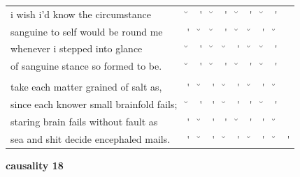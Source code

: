\documentclass[12pt, landscape]{article}
\begin{document}
\begin{center}
\begin{tabularx}{\textwidth}{
>{\lefting\arraybackslash}X
c
c
c
c
c
c
c
c
c
}

i wish i'd know the circumstance & \u{} & \'{} & \u{} & \'{} & \u{} & \'{} & \u{} & \'{} & \\
sanguine to self would be round me & \'{} & \u{} & \u{} & \'{} & \u{} & \u{} & \'{} & \u{} & \\
whenever i stepped into glance & \u{} & \'{} & \u{} & \u{} & \'{} & \u{} & \u{} & \'{} & \\
of sanguine stance so formed to be. & \u{} & \'{} & \u{} & \'{} & \u{} & \'{} & \u{} & \'{} & \\
 & & & & & & & & \\
take each matter grained of salt as, & \'{} & \u{} & \'{} & \u{} & \'{} & \u{} & \'{} & \u{} & \\
since each knower small brainfold fails; & \u{} & \'{} & \'{} & \u{} & \'{} & \'{} & \u{} & \'{} & \\
staring brain fails without fault as & \'{} & \u{} & \'{} & \'{} & \u{} & \'{} & \'{} & \u{} & \\
sea and shit decide encephaled mails. & \'{} & \u{} & \'{} & \u{} & \'{} & \u{} & \'{} & \u{} & \'{} \\

\end{tabularx}
\end{center}

\vspace*{\fill}

\newpage

\vspace*{\fill}

\noindent \textbf{causality 18}
\noindent \hfill \par
\end{document}
